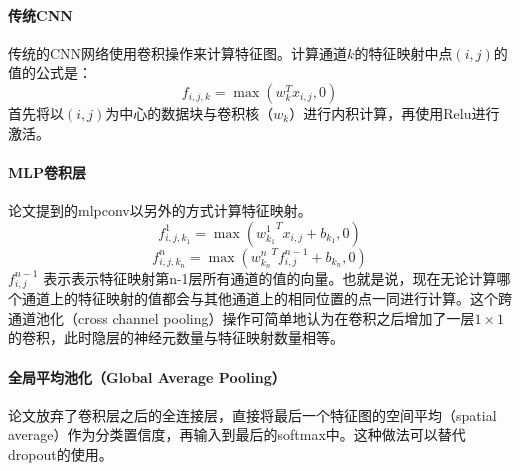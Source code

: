 \documentclass[10pt,letterpaper]{article}
\begin{document}
\paragraph{传统CNN} 传统的CNN网络使用卷积操作来计算特征图。计算通道$k$的特征映射中点$(i, j)$的值的公式是：
\begin{equation}
	f_{i,j,k} = \max(w_k^Tx_{i,j}, 0)
\end{equation}
首先将以$(i,j)$为中心的数据块与卷积核（$w_k$）进行内积计算，再使用Relu进行激活。
\paragraph{MLP卷积层} 论文提到的mlpconv以另外的方式计算特征映射。
\begin{equation}
	f^1_{i,j,k_1} = \max ({w_{k_1}^1}^Tx_{i,j} + b_{k_1}, 0)
\end{equation}
\begin{equation}
	 f^n_{i,j,k_n} = \max ({w_{k_n}^n}^Tf_{i,j}^{n-1} + b_{k_n}, 0)
\end{equation}
$f_{i,j}^{n-1}$ 表示表示特征映射第n-1层所有通道的值的向量。也就是说，现在无论计算哪个通道上的特征映射的值都会与其他通道上的相同位置的点一同进行计算。这个跨通道池化（cross channel pooling）操作可简单地认为在卷积之后增加了一层$1 \times 1$的卷积，此时隐层的神经元数量与特征映射数量相等。
\paragraph{全局平均池化（Global Average Pooling）} 论文放弃了卷积层之后的全连接层，直接将最后一个特征图的空间平均（spatial average）作为分类置信度，再输入到最后的softmax中。这种做法可以替代dropout的使用。























\end{document}
